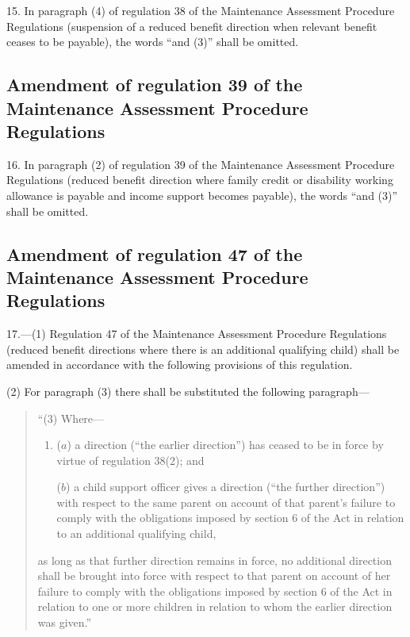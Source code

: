 \documentclass[a4paper]{article}
\begin{document}
15.  In paragraph (4) of regulation 38 of the Maintenance Assessment Procedure Regulations (suspension of a reduced benefit direction when relevant benefit ceases to be payable), the words “and (3)” shall be omitted.

\subsection[16. Amendment of regulation 39 of the Maintenance Assessment Procedure Regulations]{Amendment of regulation 39 of the Maintenance Assessment Procedure Regulations}

16.  In paragraph (2) of regulation 39 of the Maintenance Assessment Procedure Regulations (reduced benefit direction where family credit or disability working allowance is payable and income support becomes payable), the words “and (3)” shall be omitted.

\subsection[17. Amendment of regulation 47 of the Maintenance Assessment Procedure Regulations]{Amendment of regulation 47 of the Maintenance Assessment Procedure Regulations}

17.—(1) Regulation 47 of the Maintenance Assessment Procedure Regulations (reduced benefit directions where there is an additional qualifying child) shall be amended in accordance with the following provisions of this regulation.

(2) For paragraph (3) there shall be substituted the following paragraph—
\begin{quotation}
“(3) Where—
\begin{enumerate}\item[]
($a$) a direction (“the earlier direction”) has ceased to be in force by virtue of regulation 38(2); and

($b$) a child support officer gives a direction (“the further direction”) with respect to the same parent on account of that parent’s failure to comply with the obligations imposed by section 6 of the Act in relation to an additional qualifying child,
\end{enumerate}
as long as that further direction remains in force, no additional direction shall be brought into force with respect to that parent on account of her failure to comply with the obligations imposed by section 6 of the Act in relation to one or more children in relation to whom the earlier direction was given.”
\end{quotation}
\end{document}
